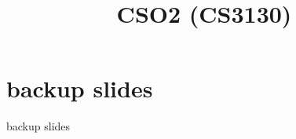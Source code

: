 \date{}
\title{CSO2 (CS3130)}

\begin{frame}
    \titlepage
\end{frame}




\section{backup slides}
\begin{frame}{backup slides}
\end{frame}


